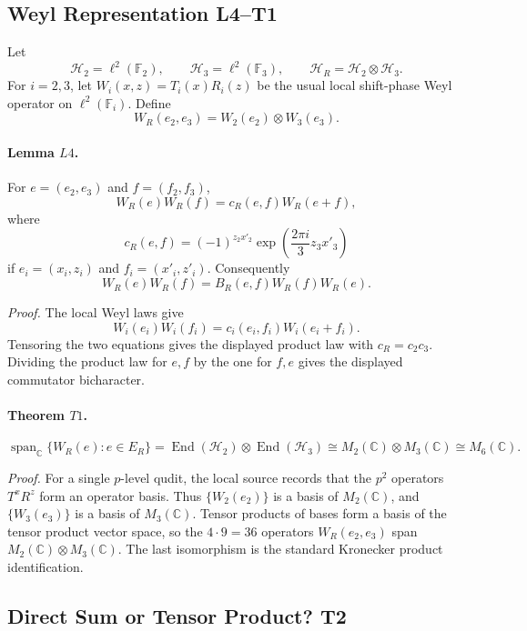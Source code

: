 \subsection{Weyl Representation L4--T1}

Let
\[
  \mathcal H_2=\ell^2(\mathbb F_2),\qquad
  \mathcal H_3=\ell^2(\mathbb F_3),\qquad
  \mathcal H_R=\mathcal H_2\otimes\mathcal H_3.
\]
For \(i=2,3\), let \(W_i(x,z)=T_i(x)R_i(z)\) be the usual local
shift-phase Weyl operator on \(\ell^2(\mathbb F_i)\).  Define
\[
  W_R(e_2,e_3)=W_2(e_2)\otimes W_3(e_3).
\]

\paragraph{Lemma \(L4\).}
For \(e=(e_2,e_3)\) and \(f=(f_2,f_3)\),
\[
  W_R(e)W_R(f)=c_R(e,f)W_R(e+f),
\]
where
\[
  c_R(e,f)=(-1)^{z_2x'_2}
  \exp\!\left(\frac{2\pi i}{3}z_3x'_3\right)
\]
if \(e_i=(x_i,z_i)\) and \(f_i=(x'_i,z'_i)\).  Consequently
\[
  W_R(e)W_R(f)=B_R(e,f)W_R(f)W_R(e).
\]

\emph{Proof.}
The local Weyl laws give
\[
  W_i(e_i)W_i(f_i)=c_i(e_i,f_i)W_i(e_i+f_i).
\]
Tensoring the two equations gives the displayed product law with
\(c_R=c_2c_3\).  Dividing the product law for \(e,f\) by the one for \(f,e\)
gives the displayed commutator bicharacter.

\paragraph{Theorem \(T1\).}
\[
  \operatorname{span}_{\mathbb C}\{W_R(e):e\in E_R\}
  =
  \operatorname{End}(\mathcal H_2)\otimes\operatorname{End}(\mathcal H_3)
  \cong M_2(\mathbb C)\otimes M_3(\mathbb C)
  \cong M_6(\mathbb C).
\]

\emph{Proof.}
For a single \(p\)-level qudit, the local source records that the \(p^2\)
operators \(T^xR^z\) form an operator basis.  Thus
\(\{W_2(e_2)\}\) is a basis of \(M_2(\mathbb C)\), and \(\{W_3(e_3)\}\) is a
basis of \(M_3(\mathbb C)\).  Tensor products of bases form a basis of the
tensor product vector space, so the \(4\cdot9=36\) operators \(W_R(e_2,e_3)\)
span \(M_2(\mathbb C)\otimes M_3(\mathbb C)\).  The last isomorphism is the
standard Kronecker product identification.

\subsection{Direct Sum or Tensor Product? T2}

